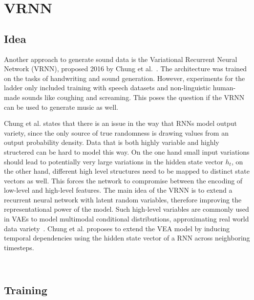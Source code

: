 \documentclass[12pt]{article}
\begin{document}
\section{VRNN}

\subsection{Idea}
Another approach to generate sound data is the Variational Recurrent Neural Network (VRNN), proposed 2016 by Chung et al.~\cite{chung2015recurrent}.
The architecture was trained on the tasks of handwriting and sound generation.
However, experiments for the ladder only included training with speech datasets and non-linguistic human-made sounds like coughing and screaming.
This poses the question if the VRNN can be used to generate music as well.

Chung et al. states that there is an issue in the way that RNNs model output variety, since the only source of true randomness is drawing values from an output probability density.
Data that is both highly variable and highly structered can be hard to model this way.
On the one hand small input variations should lead to potentially very large variations in the hidden state vector $h_t$, on the other hand, different high level structures need to be mapped to distinct state vectors as well.
This forces the network to compromise between the encoding of low-level and high-level features.
The main idea of the VRNN is to extend a recurrent neural network with latent random variables, therefore improving the representational power of the model.
Such high-level variables are commonly used in VAEs to model multimodal conditional distributions, approximating real world data variety~\cite{kingma2013auto}.
Chung et al. proposes to extend the VEA model by inducing temporal dependencies using the hidden state vector of a RNN across neighboring timesteps.



 



\subsection{Training}
\end{document}
